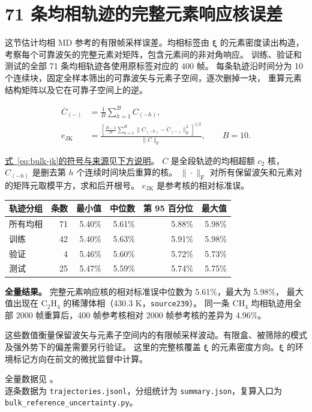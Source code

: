 \documentclass[UTF8,fontset=fandol,11pt]{ctexart}
\newcommand{\xiF}{\bm\xi}
\newcommand{\fref}[2]{\par{\footnotesize \hyperref[#1]{式~\ref{#1}的符号与来源}见\hyperref[#2]{下方说明}。}}
\newcommand{\defat}[1]{\phantomsection\label{#1}}
\begin{document}
\clearpage
\section{71 条均相轨迹的完整元素响应核误差}\label{sec:bulk-audit}

这节估计均相 MD 参考的有限帧采样误差。均相标签由 $\xiF$ 的元素密度读出构造，
考察每个可靠波矢的完整元素对矩阵，包含元素间的非对角响应。
训练、验证和测试的全部 71 条均相轨迹各使用原标签对应的 400 帧。
每条轨迹沿时间分为 10 个连续块，固定全样本筛出的可靠波矢与元素子空间，逐次删掉一块，
重算元素结构矩阵以及它在可靠子空间上的逆。

\begin{equation}
\begin{aligned}
\overline C_{(-)} &=\frac1{B}\sum_{h=1}^{B} C_{(-h)},\\
e_{\mathrm{JK}} &=
\frac{\left[\frac{B-1}{B}\sum_{h=1}^{B}
 \bigl\|C_{(-h)}-\overline C_{(-)}\bigr\|_{\mathrm F}^{2}\right]^{1/2}}
 {\|C\|_{\mathrm F}},\qquad B=10 .
\end{aligned}
\label{eq:bulk-jk}
\end{equation}
\fref{eq:bulk-jk}{def:bulk-jk}
\defat{def:bulk-jk}
$C$ 是全段轨迹的均相超额 $c_2$ 核，$C_{(-h)}$ 是删去第 $h$ 个连续时间块后重算的核。
$\|\cdot\|_{\mathrm F}$ 对所有保留波矢和元素对的矩阵元取模平方，求和后开根号。
$e_{\mathrm{JK}}$ 是参考核的相对标准误。

\begin{center}\small
\begin{tabular}{lrrrrr}
\toprule
轨迹分组 & 条数 & 最小值 & 中位数 & 第 95 百分位 & 最大值\\
\midrule
所有均相 & 71 & 5.40\% & 5.61\% & 5.88\% & 5.98\%\\
训练 & 42 & 5.40\% & 5.63\% & 5.91\% & 5.98\%\\
验证 & 4 & 5.46\% & 5.60\% & 5.72\% & 5.73\%\\
测试 & 25 & 5.47\% & 5.59\% & 5.74\% & 5.75\%\\
\bottomrule
\end{tabular}
\end{center}

\textbf{全量结果。} 完整元素响应核的相对标准误中位数为 5.61\%，最大为 5.98\%，
最大值出现在 C$_2$H$_4$ 的稀薄体相（430.3 K，\texttt{source239}）。
同一条 CH$_4$ 均相轨迹用全部 2000 帧重算后，400 帧参考核相对 2000 帧参考核的差异为 4.96\%。

这些数值衡量保留波矢与元素子空间内的有限帧采样波动。有限盒、被筛除的模式及强外势下的偏差需要另行验证。
这里的完整核覆盖 $\xiF$ 的元素密度方向。$\xiF$ 的环境标记方向在前文的微扰监督中计算。

{\footnotesize 全量数据见
。\\
逐条数据为 \texttt{trajectories.jsonl}，分组统计为 \texttt{summary.json}，复算入口为
\texttt{bulk\_reference\_uncertainty.py}。}
\end{document}

